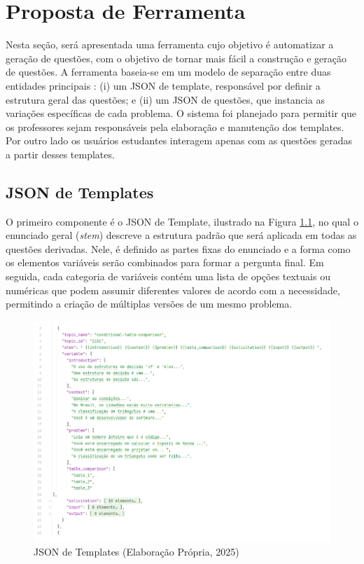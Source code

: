 \chapter{Proposta de Ferramenta}

Nesta seção, será apresentada uma ferramenta cujo objetivo é automatizar a geração de questões, com o objetivo de tornar mais fácil a construção e geração de questões. A ferramenta baseia-se em um modelo de separação entre duas entidades principais : (i) um JSON de template, responsável por definir a estrutura geral das questões; e (ii) um JSON de questões, que instancia as variações específicas de cada problema. O sistema foi planejado para permitir que os professores sejam responsáveis pela elaboração e manutenção dos templates. Por outro lado os usuários estudantes interagem apenas com as questões geradas a partir desses templates.

\section{JSON de Templates}

O primeiro componente é o JSON de Template, ilustrado na Figura \ref{fig:json-de-templates}, no qual o enunciado geral (\textit{stem}) descreve a estrutura padrão que será aplicada em todas as questões derivadas. Nele, é definido as partes fixas do enunciado e a forma como os elementos variáveis serão combinados para formar a pergunta final. Em seguida, cada categoria de variáveis contém uma lista de opções textuais ou numéricas que podem assumir diferentes valores de acordo com a necessidade, permitindo a criação de múltiplas versões de um mesmo problema.


\begin{figure}[ht]
	\centering
	\includegraphics[width=16cm]{./imagens/capitulo7/json-de-template}
	\caption{JSON de Templates (Elaboração Própria, 2025) }
	\label{fig:json-de-templates}
\end{figure}
